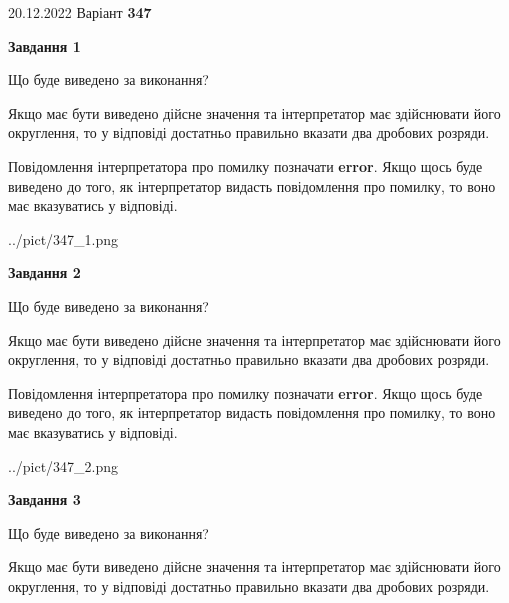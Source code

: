 \documentclass[12pt, ukrainian]{article}
\begin{document}
{20.12.2022 Варіант \No \textbf { 347 }\par}
{
\begin {Large}

{\begin {center}\textbf{Завдання 1}\end {center}}\par
Що буде виведено за виконання? \par

Якщо має бути виведено дійсне значення та інтерпретатор має здійснювати його округлення, 
то у відповіді достатньо правильно вказати два дробових розряди.

Повідомлення інтерпретатора про помилку позначати \textbf{error}.
Якщо щось буде виведено до того, як інтерпретатор видасть повідомлення про помилку, 
то воно має вказуватись у відповіді. \par

\begin{center}
	{../pict/347_1.png}
\end{center}
\newpage

{\begin {center}\textbf{Завдання 2}\end {center}}\par
Що буде виведено за виконання? \par

Якщо має бути виведено дійсне значення та інтерпретатор має здійснювати його округлення, 
то у відповіді достатньо правильно вказати два дробових розряди.

Повідомлення інтерпретатора про помилку позначати \textbf{error}.
Якщо щось буде виведено до того, як інтерпретатор видасть повідомлення про помилку, 
то воно має вказуватись у відповіді. \par

\begin{center}
	{../pict/347_2.png}
\end{center}
\newpage

{\begin {center}\textbf{Завдання 3}\end {center}}\par
Що буде виведено за виконання? \par

Якщо має бути виведено дійсне значення та інтерпретатор має здійснювати його округлення, 
то у відповіді достатньо правильно вказати два дробових розряди.


\end{Large}}
\end{document}
